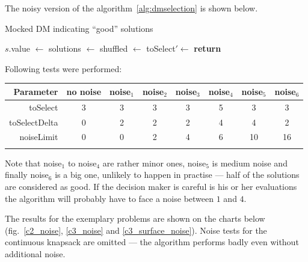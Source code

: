 The noisy version of the algorithm~\ref{alg:dmselection} is shown below.
\begin{algorithm}
\caption{Mocked DM indicating ``good'' solutions}\label{alg:noisydmselection}
  \begin{algorithmic}[1]
    \State $s.$value $\gets$ 
    \EndFor
    \State solutions $\gets$ 
    \State shuffled $\gets$ 
    \State toSelect$' \gets$ 
    \State \textbf{return} 
    \EndProcedure
  \end{algorithmic}
\end{algorithm}

Following tests were performed:

\begin{tabular}{r c c c c c c c}
  \hline
  Parameter & no noise & noise$_1$ & noise$_2$ & noise$_3$ & noise$_4$ &
  noise$_5$ & noise$_6$ \\
  \hline
  \hline
  toSelect      & 3 & 3 & 3 & 3 & 5 &  3 &  3 \\
  toSelectDelta & 0 & 2 & 2 & 2 & 4 &  4 &  2 \\
  noiseLimit    & 0 & 0 & 2 & 4 & 6 & 10 & 16 \\
  \hline \\
\end{tabular}

Note that noise$_1$ to noise$_4$ are rather minor ones, noise$_5$ is medium
noise and finally noise$_6$ is a big one, unlikely to happen in practise ---
half of the solutions are considered as good. If the decision maker is careful
is his or her evaluations the algorithm will probably have to face a noise
between $1$ and $4$.

The results for the exemplary problems are shown on the charts below
(fig.~\ref{c2_noise}, \ref{c3_noise} and \ref{c3_surface_noise}). Noise tests
for the continuous knapsack are omitted --- the algorithm performs badly even
without additional noise.

